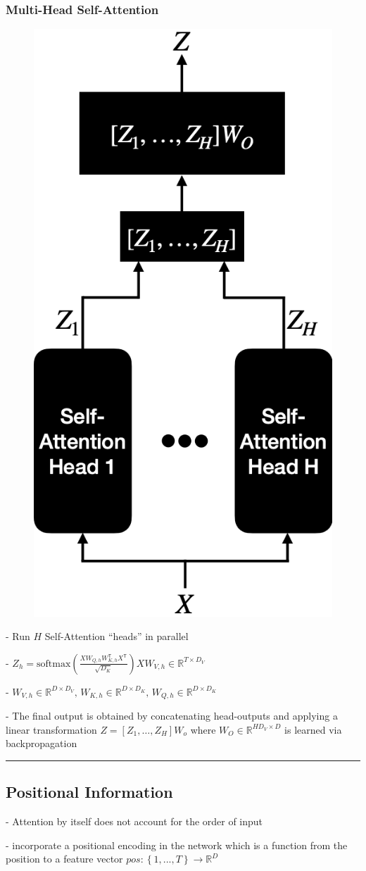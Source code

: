 \subsubsection{Multi-Head Self-Attention}

\begin{figure} 
  \centering
  \includegraphics[width=0.3\columnwidth]{figures/multi_head.png}
\end{figure}

- Run $H$ Self-Attention “heads” in parallel

- $Z_{h}={\mathrm{softmax}}\left({\frac{X W_{Q,h}W_{K,h}^{\mathsf{T}}X^{\mathsf{T}}}{\sqrt{D_{K}}}}\right)X W_{V,h}\in\mathbb{R}^{T\times D_{V}}$ 


- $W_{V,h}\in\mathbb{R}^{D\times D_{V}},\,W_{K,h}\in\mathbb{R}^{D\times D_{K}},\,W_{Q,h}\in\mathbb{R}^{D\times D_{K}}$

- The final output is obtained by concatenating head-outputs and applying a linear transformation $Z=[Z_{1},\dots,Z_{H}]W_{o}$ where $W_{O}\in\mathbb{R}^{H D_{V}\times D}$ is learned via backpropagation

\vspace{4pt}
\hrule
\vspace{4pt}
\subsection{Positional Information}

- Attention by itself does not account for the order of input

- incorporate a positional encoding in the network which is a function from the position to a feature vector $p o s:\left\{1,...,T\right\}\rightarrow\mathbb{R}^{D}$

